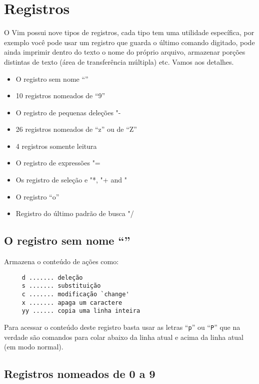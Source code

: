 
\chapter{Registros}
\label{Registros}

O Vim possui nove tipos de registros, cada tipo tem uma utilidade específica,
por exemplo você pode usar um registro que guarda o último comando digitado,
pode ainda imprimir dentro do texto o nome do próprio arquivo, armazenar
porções distintas de texto (área de transferência múltipla) etc. Vamos aos
detalhes.

\begin{itemize}
   \item O registro sem nome ``''
   \item 10 registros nomeados de ``9''
   \item O registro de pequenas deleções "-
   \item 26 registros nomeados de ``z'' ou de ``Z''
   \item 4 registros somente leitura
   \item O registro de expressões "=
   \item Os registro de seleção e  "*, "+ and "~
   \item O registro ``o''
   \item Registro do último padrão de busca "/
\end{itemize}

\section{O registro sem nome ``''}
\label{O registro sem nome ``''}

Armazena o conteúdo de ações como:

\begin{verbatim}
     d ....... deleção
     s ....... substituição
     c ....... modificação `change'
     x ....... apaga um caractere
     yy ...... copia uma linha inteira
\end{verbatim}

Para acessar o conteúdo deste registro basta usar as letras ``{\tt p}'' ou ``{\tt P}'' que
na verdade são comandos para colar abaixo da linha atual e acima da
linha atual (em modo normal).

\section{Registros nomeados de 0 a 9}
\label{Registros nomeados de 0 a 9}

